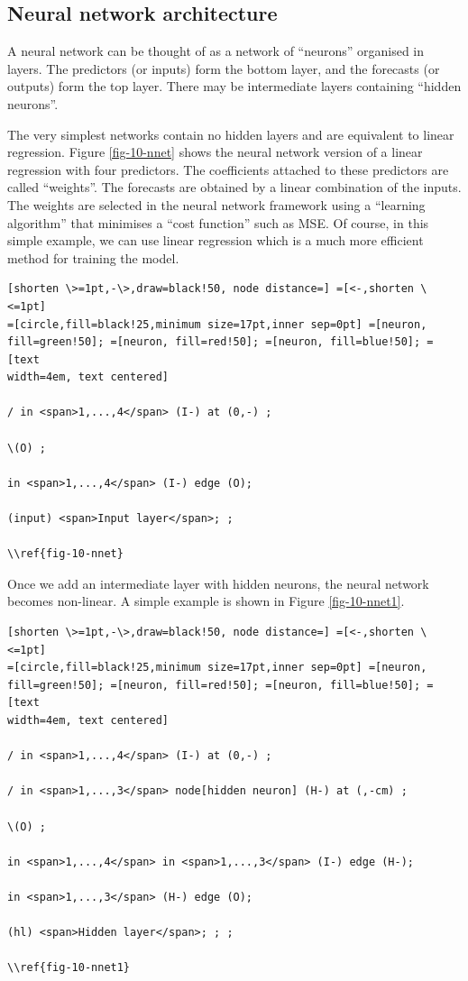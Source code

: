 \documentclass[]{book}
\begin{document}
\hypertarget{neural-network-architecture}{%
\subsection*{Neural network architecture}\label{neural-network-architecture}}

A neural network can be thought of as a network of ``neurons'' organised in layers. The predictors (or inputs) form the bottom layer, and the forecasts (or outputs) form the top layer. There may be intermediate layers containing ``hidden neurons''.

The very simplest networks contain no hidden layers and are equivalent to linear regression. Figure \ref{fig-10-nnet} shows the neural network version of a linear regression with four predictors. The coefficients attached to these predictors are called ``weights''. The forecasts are obtained by a linear combination of the inputs. The weights are selected in the neural network framework using a ``learning algorithm'' that minimises a ``cost function'' such as MSE. Of course, in this simple example, we can use linear regression which is a much more efficient method for training the model.

\begin{verbatim}
[shorten \>=1pt,-\>,draw=black!50, node distance=] =[<-,shorten \<=1pt]
=[circle,fill=black!25,minimum size=17pt,inner sep=0pt] =[neuron,
fill=green!50]; =[neuron, fill=red!50]; =[neuron, fill=blue!50]; = [text
width=4em, text centered]

/ in <span>1,...,4</span> (I-) at (0,-) ;

\(O) ;

in <span>1,...,4</span> (I-) edge (O);

(input) <span>Input layer</span>; ;

\\ref{fig-10-nnet}
\end{verbatim}

Once we add an intermediate layer with hidden neurons, the neural network becomes non-linear. A simple example is shown in Figure \ref{fig-10-nnet1}.

\begin{verbatim}
[shorten \>=1pt,-\>,draw=black!50, node distance=] =[<-,shorten \<=1pt]
=[circle,fill=black!25,minimum size=17pt,inner sep=0pt] =[neuron,
fill=green!50]; =[neuron, fill=red!50]; =[neuron, fill=blue!50]; = [text
width=4em, text centered]

/ in <span>1,...,4</span> (I-) at (0,-) ;

/ in <span>1,...,3</span> node[hidden neuron] (H-) at (,-cm) ;

\(O) ;

in <span>1,...,4</span> in <span>1,...,3</span> (I-) edge (H-);

in <span>1,...,3</span> (H-) edge (O);

(hl) <span>Hidden layer</span>; ; ;

\\ref{fig-10-nnet1}
\end{verbatim}
\end{document}
